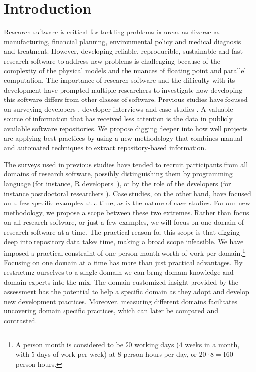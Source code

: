 \documentclass[runningheads]{llncs}
\begin{document}
\section{Introduction} \label{SecIntroduction}

Research software is critical for tackling problems in areas as diverse as
manufacturing, financial planning, environmental policy and medical diagnosis
and treatment.  However, developing reliable, reproducible, sustainable and fast
research software to address new problems is challenging because of the
complexity of the physical models and the nuances of floating point and parallel
computation. The importance of research software and the difficulty with its
development have prompted multiple researchers to investigate how developing
this software differs from other classes of software.  Previous studies have
focused on surveying developers
\cite{HannayEtAl2009,Nguyen-HoanEtAl2010,PintoEtAl2018}, developer interviews
\cite{Kelly2013} and case studies \cite{CarverEtAl2007,Segal2005}.  A
valuable source of information that has received less attention is the data in
publicly available software repositories.  We propose digging deeper into how
well projects are applying best practices by using a new methodology that
combines manual and automated techniques to extract repository-based
information.

The surveys used in previous studies have tended to recruit participants from
all domains of research software, possibly distinguishing them by programming
language (for instance, R developers~\cite{PintoEtAl2018}), or by the role of
the developers (for instance postdoctoral researchers \cite{UditAndKatz2017}).
Case studies, on the other hand, have focused on a few specific examples at a
time, as is the nature of case studies.  For our new methodology, we propose a
scope between these two extremes.  Rather than focus on all research software,
or just a few examples, we will focus on one domain of research software at a
time. The practical reason for this scope is that digging deep into
repository data takes time, making a broad scope infeasible. We have imposed
a practical constraint of one person month worth of work per domain.\footnote{A person
month is considered to be $20$ working days ($4$ weeks in a month, with $5$ days
of work per week) at $8$ person hours per day, or $20 \cdot 8 = 160$ person
hours.} Focusing on one domain at a time has more than just practical
advantages.  By restricting ourselves to a single domain we can bring domain
knowledge and domain experts into the mix.  The domain customized insight
provided by the assessment has the potential to help a specific domain as they
adopt and develop new development practices.  Moreover, measuring different
domains facilitates uncovering domain specific practices, which can later be
compared and contrasted.
\end{document}
